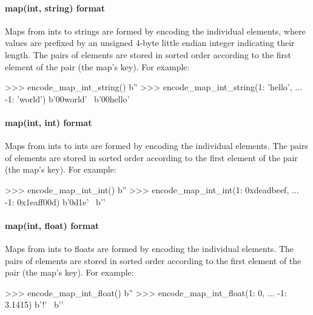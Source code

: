 \paragraph{map(int, string) format}

Maps from ints to strings are formed by encoding the individual elements, where
values are prefixed by an unsigned 4-byte little endian integer indicating their
length.  The pairs of elements are stored in sorted order according to the first
element of the pair (the map's key).  For example:

\begin{pythoncode}
>>> encode_map_int_string({})
b''
>>> encode_map_int_string({1: 'hello',
...                        -1: 'world'})
b'\xff\xff\xff\xff\xff\xff\xff\xff{}\x00world' \
b'\x00hello'
\end{pythoncode}

\paragraph{map(int, int) format}

Maps from ints to ints are formed by encoding the individual elements.  The
pairs of elements are stored in sorted order according to the first element of
the pair (the map's key).  For example:

\begin{pythoncode}
>>> encode_map_int_int({})
b''
>>> encode_map_int_int({1: 0xdeadbeef,
...                     -1: 0x1eaff00d})
b'\xff\xff\xff\xff\xff\xff\xff\xff\x0d\xaf\x1e' \
b'\xef\xbe\xad\xde{}'
\end{pythoncode}

\paragraph{map(int, float) format}

Maps from ints to floats are formed by encoding the individual elements.  The
pairs of elements are stored in sorted order according to the first element of
the pair (the map's key).  For example:

\begin{pythoncode}
>>> encode_map_int_float({})
b''
>>> encode_map_int_float({1: 0,
...                       -1: 3.1415})
b'\xff\xff\xff\xff\xff\xff\xff\xffo{}\xca!\t@' \
b''
\end{pythoncode}

